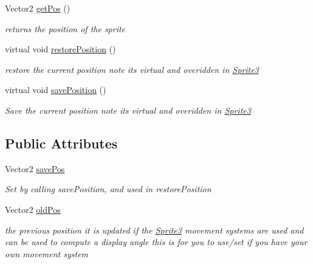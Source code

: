 \begin{DoxyCompactItemize}
Vector2 \mbox{\hyperlink{class_r_c___framework_1_1_sprite3_parent_aabeda600912d35738cdb6de98a40282a}{get\+Pos}} ()
\begin{DoxyCompactList}\small\item\em returns the position of the sprite \end{DoxyCompactList}\item 
virtual void \mbox{\hyperlink{class_r_c___framework_1_1_sprite3_parent_ad67b46aec70ebe4a720dc4550108b8c1}{restore\+Position}} ()
\begin{DoxyCompactList}\small\item\em restore the current position note its virtual and overidden in \mbox{\hyperlink{class_r_c___framework_1_1_sprite3}{Sprite3}} \end{DoxyCompactList}\item 
virtual void \mbox{\hyperlink{class_r_c___framework_1_1_sprite3_parent_ad934c0f7664064c6ac89525bf06516fc}{save\+Position}} ()
\begin{DoxyCompactList}\small\item\em Save the current position note its virtual and overidden in \mbox{\hyperlink{class_r_c___framework_1_1_sprite3}{Sprite3}} \end{DoxyCompactList}\end{DoxyCompactItemize}
\subsection*{Public Attributes}
\begin{DoxyCompactItemize}
\item 
Vector2 \mbox{\hyperlink{class_r_c___framework_1_1_sprite3_parent_ade2887bc3eda096dd75498936daae484}{save\+Pos}}
\begin{DoxyCompactList}\small\item\em Set by calling save\+Position, and used in restore\+Position \end{DoxyCompactList}\item 
Vector2 \mbox{\hyperlink{class_r_c___framework_1_1_sprite3_parent_a81a19273a375b067b83c5e01909bc576}{old\+Pos}}
\begin{DoxyCompactList}\small\item\em the previous position it is updated if the \mbox{\hyperlink{class_r_c___framework_1_1_sprite3}{Sprite3}} movement systems are used and can be used to compute a display angle this is for you to use/set if you have your own movement system \end{DoxyCompactList}\end{DoxyCompactItemize}

